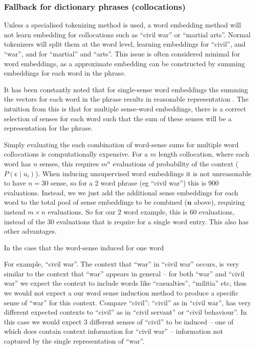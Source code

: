 \documentclass{sig-alternate}
\renewcommand{\u}{\mathbf{u}}
\begin{document}
\subsubsection {Fallback for dictionary phrases (collocations)}
Unless a specialised tokenizing method is used, a word embedding method will not learn embedding for collocations such as ``civil war'' or ``martial arts''. Normal tokenizers will split them at the word level, learning embeddings for ``civil'', and ``war'', and for ``martial'' and ``arts''. This issue is often considered minimal for word embeddings, as a approximate embedding can be constructed by summing embeddings for each word  in the phrase.

It has been constantly noted that for single-sense word embeddings the summing the vectors for each word in the phrase results in reasonable representation \parencite{mikolovSkip, White2015SentVecMeaning} . The intuition from this is that for multiple sense-word embeddings, there is a correct selection of senses for each word such that the sum of these senses will be a representation for the phrase.

Simply evaluating the each combination of word-sense sums for multiple word collocations is computationally expensive. For a $m$ length collocation, where each word has $n$ senses, this requires $m^n$ evaluations of probability of the context ($P(\mathbb{c}\mid u_i)$). When inducing unsupervised word embeddings it is not unreasonable to have $n=30$ sense, so for a 2 word phrase (eg ``civil war'') this is 900 evaluations.
Instead, we we just add the additional sense embeddings for each word to the total pool of sense embeddings to be combined ($\u$ above), requiring instead $m \times n$ evaluations. So for our 2 word example, this is 60 evaluations, instead of the 30 evaluations that is require for a single word entry. This also has other advantages.


In the case that the word-sense induced for one word 

For example, ``civil war''. The context that ``war'' in ``civil war'' occurs, is very similar to the context that ``war'' appears in general -- for both ``war'' and ``civil war'' we expect the context to include words like ``casualties'', ``militia'' etc, thus we would not expect a our word sense induction method to produce a specific sense of ``war'' for this context.
Compare ``civil'': ``civil'' as in ``civil war'', has very different expected contexts to ``civil'' as in ``civil servant'' or ``civil behaviour''. In this case we would expect 3 different senses of ``civil'' to be induced -- one of which does contain context information for ``civil war'' -- information not captured by the single representation of ``war''.
\end{document}

